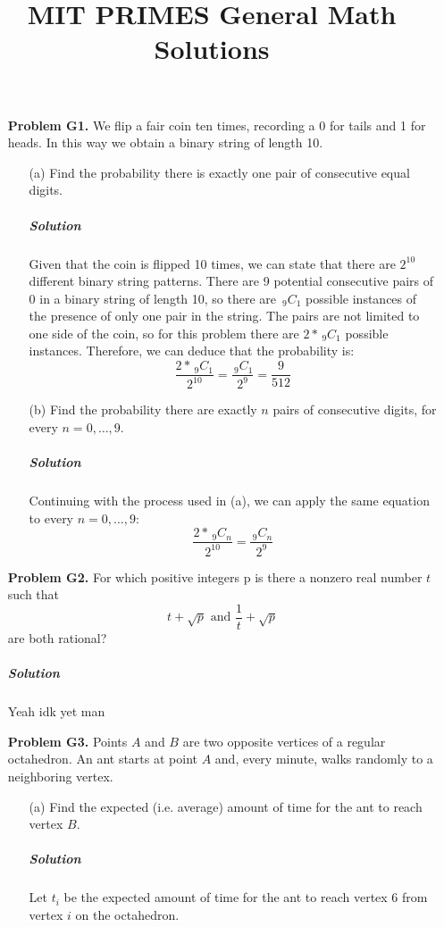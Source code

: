 \documentclass[10pt,a4paper]{article}
\title{MIT PRIMES General Math Solutions}
\newcommand{\nCr}[2]{\,_{#1}C_{#2}} %
\begin{document}
	\begin{itemize}
		\item[\textbf{Problem G1.}] We flip a fair coin ten times, recording a 0 for tails and 1 for heads. In this way we obtain a binary string of length 10.
		
		\begin{enumerate}
			\item[(a)] Find the probability there is exactly one pair of consecutive equal digits.
			
			\subparagraph{Solution}Given that the coin is flipped 10 times, we can state that there are $2^{10}$ different binary string patterns. There are 9 potential consecutive pairs of 0 in a binary string of length 10, so there are $\nCr{9}{1}$ possible instances of the presence of only one pair in the string. The pairs are not limited to one side of the coin, so for this problem there are $2*\nCr{9}{1}$ possible instances. Therefore, we can deduce that the probability is:
			\[ \frac{2*\nCr{9}{1}}{2^{10}}=\frac{\nCr{9}{1}}{2^{9}}=\frac{9}{512} \]
			
			\item[(b)] Find the probability there are exactly $n$ pairs of consecutive digits, for every $n=0,\dotsc,9$.
			
			\subparagraph{Solution}Continuing with the process used in (a), we can apply the same equation to every $n=0,\dotsc,9$:
			\[ \frac{2*\nCr{9}{n}}{2^{10}}=\frac{\nCr{9}{n}}{2^{9}} \]
		\end{enumerate}
		
		\item[\textbf{Problem G2.}] For which positive integers p is there a nonzero real number $t$ such that \[ t+\sqrt{p}  \text{ and } \frac{1}{t}+\sqrt{p}\] are both rational?
		
		\subparagraph{Solution}Yeah idk yet man
		
		\item[\textbf{Problem G3.}] Points $A$ and $B$ are two opposite vertices of a regular octahedron. An ant starts at point $A$ and, every minute, walks randomly to a neighboring vertex.
		
		\begin{enumerate}
			\item[(a)] Find the expected (i.e. average) amount of time for the ant to reach vertex $B$.
			
			\subparagraph{Solution} Let $t_i$ be the expected amount of time for the ant to reach vertex 6 from vertex $i$ on the octahedron.
			

\end{enumerate}
\end{itemize}
\end{document}
